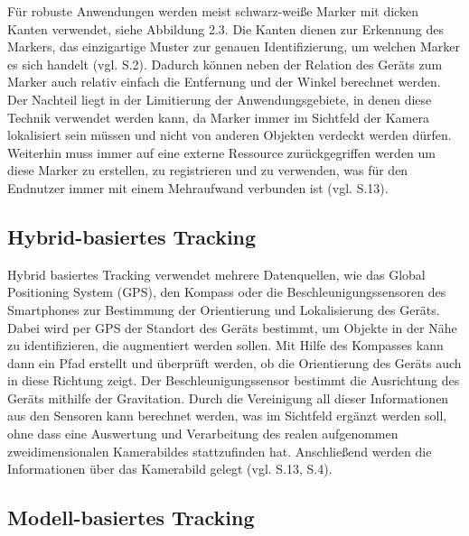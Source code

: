 Für robuste Anwendungen werden meist schwarz-weiße Marker mit dicken Kanten verwendet, siehe Abbildung 2.3. Die Kanten dienen zur Erkennung des Markers, das einzigartige Muster zur genauen Identifizierung, um welchen Marker es sich handelt (vgl. \cite{markers} S.2). Dadurch können neben der Relation des Geräts zum Marker auch relativ einfach die Entfernung und der Winkel berechnet werden. Der Nachteil liegt in der Limitierung der Anwendungsgebiete, in denen diese Technik verwendet werden kann, da Marker immer im Sichtfeld der Kamera lokalisiert sein müssen und nicht von anderen Objekten verdeckt werden dürfen. Weiterhin muss immer auf eine externe Ressource zurückgegriffen werden um diese Marker zu erstellen, zu registrieren und zu verwenden, was für den Endnutzer immer mit einem Mehraufwand verbunden ist (vgl. \cite{comparative_sdks} S.13).

\subsection{Hybrid-basiertes Tracking}

Hybrid basiertes Tracking verwendet mehrere Datenquellen, wie das Global Positioning System (GPS), den Kompass oder die Beschleunigungssensoren des Smartphones zur Bestimmung der Orientierung und Lokalisierung des Geräts. Dabei wird per GPS der Standort des Geräts bestimmt, um Objekte in der Nähe zu identifizieren, die augmentiert werden sollen. Mit Hilfe des Kompasses kann dann ein Pfad erstellt und überprüft werden, ob die Orientierung des Geräts auch in diese Richtung zeigt. Der Beschleunigungssensor bestimmt die Ausrichtung des Geräts mithilfe der Gravitation. Durch die Vereinigung all dieser Informationen aus den Sensoren kann berechnet werden, was im Sichtfeld ergänzt werden soll, ohne dass eine Auswertung und Verarbeitung des realen aufgenommen zweidimensionalen Kamerabildes stattzufinden hat. Anschließend werden die Informationen über das Kamerabild gelegt  (vgl. \cite{comparative_sdks} S.13, \cite{vorraussetzungen} S.4).

\subsection{Modell-basiertes Tracking}

